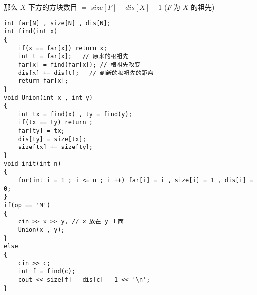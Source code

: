 \documentclass[E:/GsjzTle/main/main.tex]{subfiles}
\begin{document}
那么 \(X\) 下方的方块数目 \(=\) \(size[F] - dis[X] - 1\) (\(F\) 为 \(X\)
的祖先)

\begin{lstlisting}
int far[N] , size[N] , dis[N];
int find(int x)
{
	if(x == far[x]) return x;
	int t = far[x];   // 原来的根祖先 
	far[x] = find(far[x]); // 根祖先改变 
	dis[x] += dis[t];   // 到新的根祖先的距离  
	return far[x];
}
void Union(int x , int y)
{
	int tx = find(x) , ty = find(y);
	if(tx == ty) return ;
	far[ty] = tx; 
	dis[ty] = size[tx];
	size[tx] += size[ty];
}
void init(int n)
{
	for(int i = 1 ; i <= n ; i ++) far[i] = i , size[i] = 1 , dis[i] = 0;
}
if(op == 'M')
{
	cin >> x >> y; // x 放在 y 上面
	Union(x , y);
}
else
{
	cin >> c;
	int f = find(c);
	cout << size[f] - dis[c] - 1 << '\n';
}
\end{lstlisting}
\end{document}
